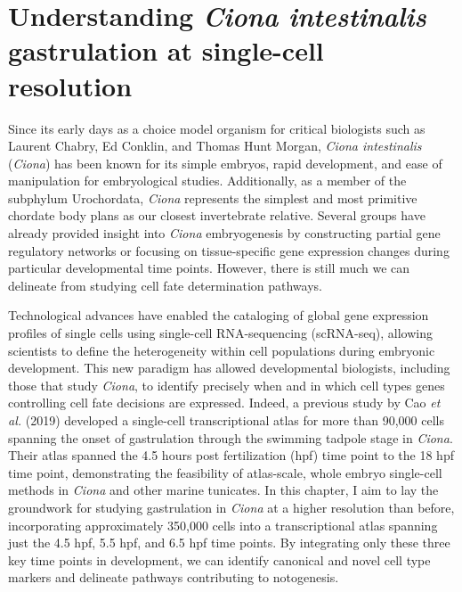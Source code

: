 \chapter{Understanding \textit{Ciona intestinalis} gastrulation at single-cell resolution}
\label{chap:Ciona intestinalis gastrulation}

Since its early days as a choice model organism for critical biologists such as Laurent Chabry, Ed Conklin, and Thomas Hunt Morgan, \textit{Ciona intestinalis} (\textit{Ciona}) has been known for its simple embryos, rapid development, and ease of manipulation for embryological studies. Additionally, as a member of the subphylum Urochordata, \textit{Ciona} represents the simplest and most primitive chordate body plans as our closest invertebrate relative. Several groups have already provided insight into \textit{Ciona} embryogenesis by constructing partial gene regulatory networks or focusing on tissue-specific gene expression changes during particular developmental time points. However, there is still much we can delineate from studying cell fate determination pathways. 

Technological advances have enabled the cataloging of global gene expression profiles of single cells using single-cell RNA-sequencing (scRNA-seq), allowing scientists to define the heterogeneity within cell populations during embryonic development. This new paradigm has allowed developmental biologists, including those that study \textit{Ciona}, to identify precisely when and in which cell types genes controlling cell fate decisions are expressed. Indeed, a previous study by Cao \textit{et al.} (2019) developed a single-cell transcriptional atlas for more than 90,000 cells spanning the onset of gastrulation through the swimming tadpole stage in \textit{Ciona}. Their atlas spanned the 4.5 hours post fertilization (hpf) time point to the 18 hpf time point, demonstrating the feasibility of atlas-scale, whole embryo single-cell methods in \textit{Ciona} and other marine tunicates. In this chapter, I aim to lay the groundwork for studying gastrulation in \textit{Ciona} at a higher resolution than before, incorporating approximately 350,000 cells into a transcriptional atlas spanning just the 4.5 hpf, 5.5 hpf, and 6.5 hpf time points. By integrating only these three key time points in development, we can identify canonical and novel cell type markers and delineate pathways contributing to notogenesis.

